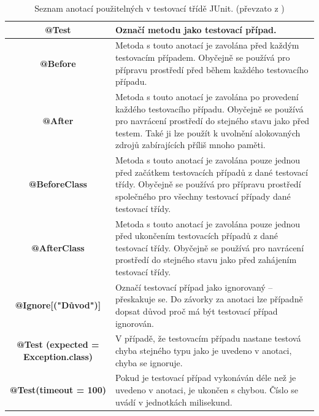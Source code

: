     \begin{table}
      \renewcommand{\tabularxcolumn}[1]{>{\small}m{#1}}
      \centering
      \begin{tabularx}{\textwidth}{|c|X|}
	\hline
	\textbf{@Test} & Označí metodu jako testovací případ.\\ \hline
	\textbf{@Before} & Metoda s touto anotací je zavolána před každým testovacím případem. Obyčejně se používá pro přípravu prostředí před během každého testovacího případu.\\ \hline
	\textbf{@After} & Metoda s touto anotací je zavolána po provedení každého testovacího případu. Obyčejně se používá pro navrácení prostředí do stejného stavu jako před testem. Také ji lze použít k uvolnění alokovaných zdrojů zabírajících příliš mnoho paměti.\\ \hline
	\textbf{@BeforeClass} & Metoda s touto anotací je zavolána pouze jednou před začátkem testovacích případů z dané testovací třídy.  Obyčejně se používá pro přípravu prostředí společného pro všechny testovací případy dané testovací třídy.\\ \hline
	\textbf{@AfterClass} & Metoda s touto anotací je zavolána pouze jednou před ukončením testovacích případů z dané testovací třídy. Obyčejně se používá pro navrácení prostředí do stejného stavu jako před zahájením testovací třídy.\\ \hline
	\textbf{@Ignore[("Důvod")]} & Označí testovací případ jako ignorovaný -- přeskakuje se. Do závorky za anotaci lze případně dopsat důvod proč má být testovací případ ignorován.\\ \hline
	\textbf{@Test (expected = Exception.class)} & V případě, že testovacím případu nastane testová chyba stejného typu jako je uvedeno v anotaci, chyba se ignoruje.\\ \hline
	\textbf{@Test(timeout = 100)} & Pokud je testovací případ vykonáván déle než je uvedeno v anotaci, je ukončen s chybou. Číslo se uvádí v jednotkách milisekund.\\
	\hline
      \end{tabularx}
      \label{tab:junit_annotations}
      \caption{Seznam anotací použitelných v testovací třídě JUnit. (převzato z \cite{vogella:JUnit})}
    \end{table}


